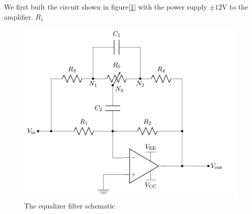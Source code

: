 We first built the circuit shown in figure[\ref{fig:circ1}] with the power supply $\pm12\si{\volt}$ to the amplifier. $R_1$

\begin{figure}[!htbp]
	\centering
	\begin{framed}
		\includegraphics[width=\linewidth]{images/circ1.png}
		\caption{The equalizer filter schematic}
		\label{fig:circ1}
	\end{framed}
\end{figure}